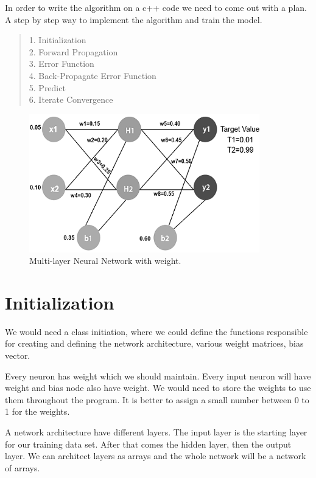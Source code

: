 \documentclass[12pt]{article}
\begin{document}
In order to write the algorithm on a c++ code we need to come out with a plan. A step by step way to implement the algorithm and train the model.

\begin{quote}
1. Initialization\\
2. Forward Propagation\\
3. Error Function\\
4. Back-Propagate Error Function\\
5. Predict\\
6. Iterate Convergence\\
\end{quote}  

\newpage
\begin{figure}
	\centering
	\includegraphics[width=100mm]{images/layers-weight.png}
	\caption{Multi-layer Neural Network with weight.}
	\label{fig:layer-weight}
\end{figure}

\section{Initialization}
We would need a class initiation, where we could define the functions responsible for creating and defining the network architecture, various weight matrices, bias vector.

Every neuron has weight which we should maintain. Every input neuron will have weight and bias node also have weight. We would need to store the weights to use them throughout the program. It is better to assign a small number between 0 to 1 for the weights.

A network architecture have different layers. The input layer is the starting layer for our training data set. After that comes the hidden layer, then the output layer. We can architect layers as arrays and the whole network will be a network of arrays.
\end{document}
